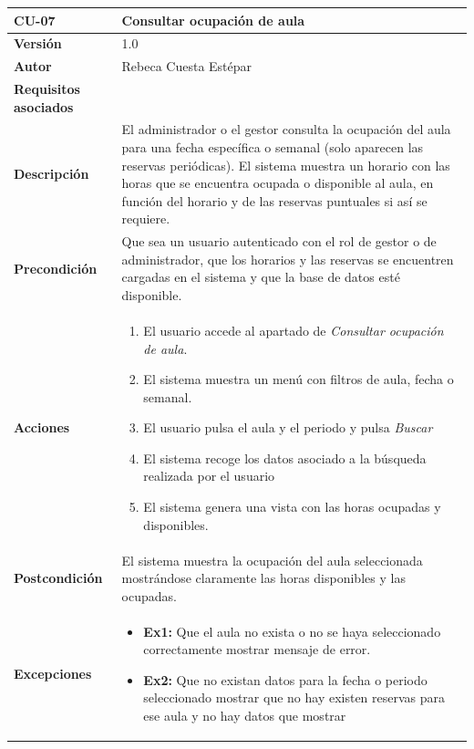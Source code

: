 \begin{table}[p]
	\centering
	\begin{tabularx}{\linewidth}{ p{} p{} }
		\toprule
		\textbf{CU-07}    & \textbf{Consultar ocupación de aula}\\
		\toprule
		\textbf{Versión}              & 1.0    \\
		\textbf{Autor}                & Rebeca Cuesta Estépar \\
		\textbf{Requisitos asociados} &  \\
		\textbf{Descripción}          & El administrador o el gestor consulta la ocupación del aula para una fecha específica o semanal (solo aparecen las reservas periódicas). El sistema muestra un horario con las horas que se encuentra ocupada o disponible al aula, en función del horario y de las reservas puntuales si así se requiere.\\
		\textbf{Precondición}         & Que sea un usuario autenticado con el rol de gestor o de administrador, que los horarios y las reservas se encuentren cargadas en el sistema y que la base de datos esté disponible. \\
		\textbf{Acciones}             &
		\begin{enumerate}
			\def\labelenumi{\arabic{enumi}.}
			\tightlist
			\item El usuario accede al apartado de \emph{Consultar ocupación de aula}.
			\item El sistema muestra un menú con filtros de aula, fecha o semanal.
			\item El usuario pulsa el aula y el periodo y pulsa \emph{Buscar}
			\item El sistema recoge los datos asociado a la búsqueda realizada por el usuario
			\item El sistema genera una vista con las horas ocupadas y disponibles.
		\end{enumerate}\\
		\textbf{Postcondición}        &  El sistema muestra la ocupación del aula seleccionada mostrándose claramente las horas disponibles y las ocupadas.\\
		\textbf{Excepciones}          & 
		\begin{itemize}[itemsep=0.15em, parsep=0pt, topsep=0pt, leftmargin=*]
			\tightlist
			\item \textbf{Ex1:} Que el aula no exista o no se haya seleccionado correctamente \textrightarrow mostrar mensaje de error.
			\item \textbf{Ex2:} Que no existan datos para la fecha o periodo seleccionado \textrightarrow mostrar que no hay existen reservas para ese aula y no hay datos que mostrar

\end{itemize}
\end{tabularx}
\end{table}
